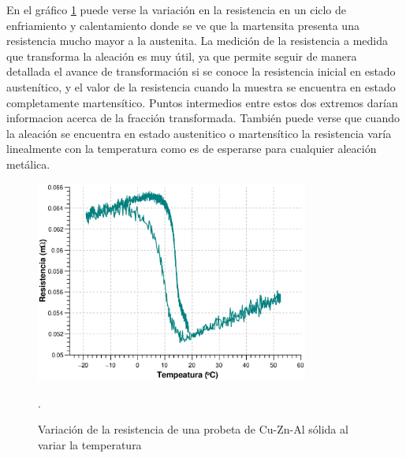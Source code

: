\documentclass[a4paper,12pt,fleqn,twoside,openany]{book}
\begin{document}
 

En el gráfico \ref{fig:RvsTClavo5} puede verse la variación en la resistencia en un ciclo de enfriamiento y calentamiento donde se ve que la martensita
presenta una resistencia mucho mayor a la austenita. La medición de la resistencia a medida que transforma la aleación es muy útil, ya que permite seguir 
de manera detallada el avance de transformación si se conoce la resistencia inicial en estado austenítico, y el valor de la resistencia cuando la 
muestra se encuentra en estado completamente martensítico. Puntos intermedios entre estos dos extremos darían informacion acerca de la fracción transformada.
También puede verse que cuando la aleación se encuentra en estado austenitico o martensítico la resistencia varía linealmente con la temperatura como es 
de esperarse para cualquier aleación metálica. 

\begin{figure}[h]
 \centering
 \includegraphics[width=0.8\textwidth]{Img/Resultados/RvsTClavo5.eps}
 \caption{Variación de la resistencia de una probeta de Cu-Zn-Al sólida al variar la temperatura}. 
 \label{fig:RvsTClavo5}
 \end{figure}
\end{document}
